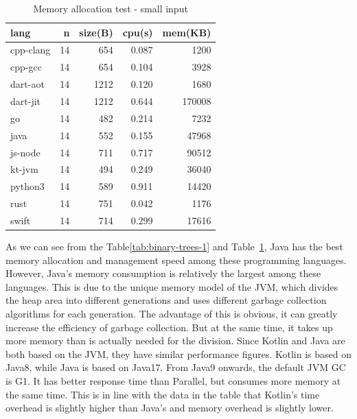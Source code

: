 \begin{table}[htbp]
    \caption{Memory allocation test - small input}
    \label{tab:binary-trees-2}
    \begin{center}
        \begin{tabular}{lrrrr}
            \toprule
            lang      & n  & size(B) & cpu(s) & mem(KB) \\
            \midrule
            cpp-clang & 14 & 654     & 0.087  & 1200    \\
            cpp-gcc   & 14 & 654     & 0.104  & 3928    \\
            dart-aot  & 14 & 1212    & 0.120  & 1680    \\
            dart-jit  & 14 & 1212    & 0.644  & 170008  \\
            go        & 14 & 482     & 0.214  & 7232    \\
            java      & 14 & 552     & 0.155  & 47968   \\
            js-node   & 14 & 711     & 0.717  & 90512   \\
            kt-jvm    & 14 & 494     & 0.249  & 36040   \\
            python3   & 14 & 589     & 0.911  & 14420   \\
            rust      & 14 & 751     & 0.042  & 1176    \\
            swift     & 14 & 714     & 0.299  & 17616   \\
            \bottomrule
        \end{tabular}
    \end{center}
\end{table}

As we can see from the Table\ref{tab:binary-trees-1} and Table~\ref{tab:binary-trees-2},
Java has the best memory allocation and management
speed among these programming languages.
However, Java's memory consumption is relatively the largest among these languages.
This is due to the unique memory model of the JVM, which divides the heap area into
different generations and uses different garbage collection algorithms for each generation.
The advantage of this is obvious, it can greatly increase the efficiency of garbage
collection. But at the same time, it takes up more memory than is actually needed for the division.
Since Kotlin and Java are both based on the JVM, they have similar performance figures.
Kotlin is based on Java8, while Java is based on Java17. From Java9 onwards, the default JVM GC is G1.
It has better response time than Parallel, but consumes more memory at the same time.
This is in line with the data in the table that Kotlin's time overhead is slightly higher
than Java's and memory overhead is slightly lower.

